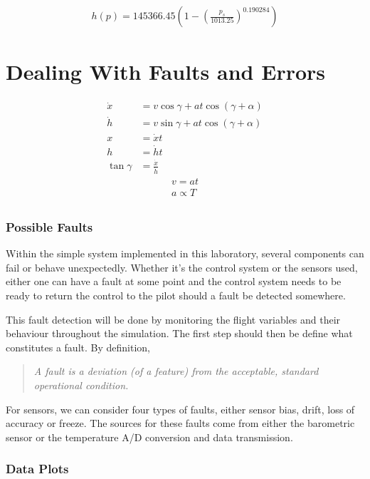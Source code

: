 \documentclass[english,palatino]{ist-report}
\begin{document}
\begin{gather*}
	h(p) = 145366.45\left(1 - \left(\frac{p_s}{1013.25}\right)^{0.190284}\right)
\end{gather*}

\part{Dealing With Faults and Errors}

\begin{align*}
	\dot{x} &= v\cos\gamma + at\cos(\gamma + \alpha) \\
	\dot{h} &= v\sin\gamma + at\cos(\gamma + \alpha) \\
	x &= \dot{x}t \\
	h &= \dot{h}t \\
	\tan\gamma &= \frac{\dot{x}}{\dot{h}}
\end{align*}
\begin{gather*}
	v = at \\
	a \propto T \\
\end{gather*}

\section{Possible Faults}

Within the simple system implemented in this laboratory, several components can fail or behave unexpectedly. Whether it's the control system or the sensors used, either one can have a fault at some point and the control system needs to be ready to return the control to the pilot should a fault be detected somewhere.

This fault detection will be done by monitoring the flight variables and their behaviour throughout the simulation. The first step should then be define what constitutes a fault. By definition,
\begin{quote} \itshape
	A fault is a deviation (of a feature) from the acceptable, standard operational condition.
\end{quote}
For sensors, we can consider four types of faults, either sensor bias, drift, loss of accuracy or freeze. The sources for these faults come from either the barometric sensor or the temperature A/D conversion and data transmission.

\listoftodos

\pagebreak
\appendix

\section{Data Plots}
\end{document}
